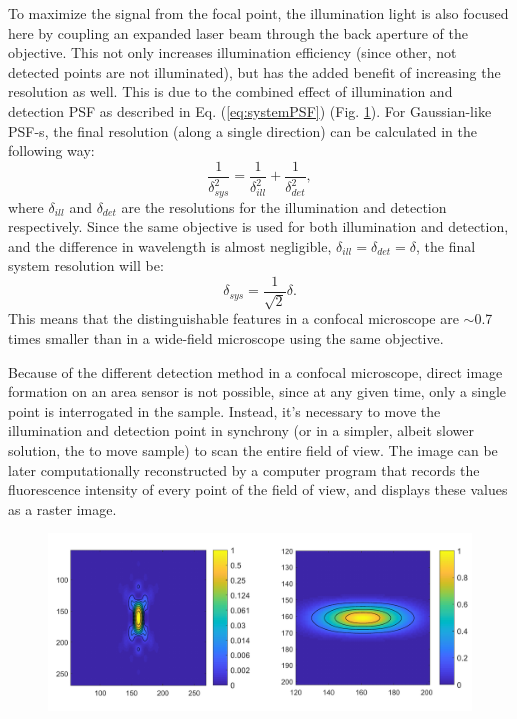     To maximize the signal from the focal point, the illumination light is also focused here by coupling an expanded laser beam through the back aperture of the objective. This not only increases illumination efficiency (since other, not detected points are not illuminated), but has the added benefit of increasing the resolution as well. This is due to the combined effect of illumination and detection PSF as described in Eq. (\ref{eq:systemPSF}) (Fig. \ref{fig:psf-confocal}). For Gaussian-like PSF-s, the final resolution (along a single direction) can be calculated in the following way:
    \begin{equation}
      \frac{1}{\delta _{sys}^2} = \frac{1}{\delta _{ill}^2} + \frac{1}{\delta _{det}^2},
      \label{eq:systemRes}
    \end{equation}
    where $\delta_{ill}$ and $\delta_{det}$ are the resolutions for the illumination and detection respectively. Since the same objective is used for both illumination and detection, and the difference in wavelength is almost negligible, $\delta_{ill} = \delta_{det} = \delta$, the final system resolution will be:
    \begin{equation}
      \delta_{sys} = \frac{1}{\sqrt{2}} \delta.
    \end{equation}
    This means that the distinguishable features in a confocal microscope are $\sim$0.7 times smaller than in a wide-field microscope using the same objective.

    Because of the different detection method in a confocal microscope, direct image formation on an area sensor is not possible, since at any given time, only a single point is interrogated in the sample. Instead, it's necessary to move the illumination and detection point in synchrony (or in a simpler, albeit slower solution, the to move sample) to scan the entire field of view. The image can be later computationally reconstructed by a computer program that records the fluorescence intensity of every point of the field of view, and displays these values as a raster image.


    \begin{figure}
      \centering
      \includegraphics[width=1\textwidth]{psfs/confocal.pdf}
      \label{fig:psf-confocal}
    \end{figure}


